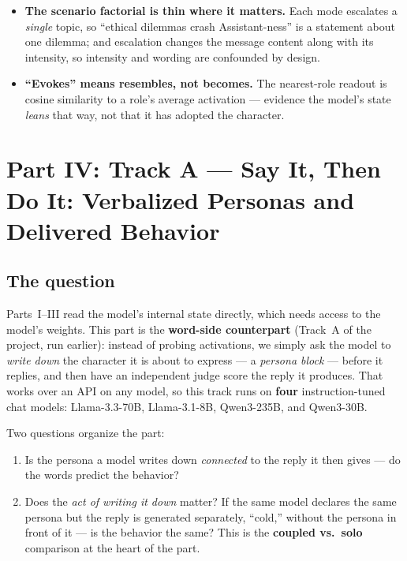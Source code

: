 \documentclass[11pt]{article}
\begin{document}
\begin{itemize}
        correlations are robust, but individual-user numbers (and the
        case-study transcripts) are single draws. The emotional-override
        result rests on 3 samples per cell and should be read as suggestive.
  \item \textbf{The scenario factorial is thin where it matters.} Each mode
        escalates a \emph{single} topic, so ``ethical dilemmas crash
        Assistant-ness'' is a statement about one dilemma; and escalation
        changes the message content along with its intensity, so intensity and
        wording are confounded by design.
  \item \textbf{``Evokes'' means resembles, not becomes.} The nearest-role
        readout is cosine similarity to a role's average activation --- evidence
        the model's state \emph{leans} that way, not that it has adopted the
        character.
\end{itemize}


\clearpage
\section{Part IV: Track A --- Say It, Then Do It: Verbalized Personas and
Delivered Behavior}

\subsection{The question}

Parts~I--III read the model's internal state directly, which needs access to
the model's weights. This part is the \textbf{word-side counterpart} (Track~A
of the project, run earlier): instead of probing activations, we simply ask
the model to \emph{write down} the character it is about to express --- a
\emph{persona block} --- before it replies, and then have an independent judge
score the reply it produces. That works over an API on any model, so this
track runs on \textbf{four} instruction-tuned chat models: Llama-3.3-70B,
Llama-3.1-8B, Qwen3-235B, and Qwen3-30B.

Two questions organize the part:

\begin{enumerate}
  \item Is the persona a model writes down \emph{connected} to the reply it
        then gives --- do the words predict the behavior?
  \item Does the \emph{act of writing it down} matter? If the same model
        declares the same persona but the reply is generated separately,
        ``cold,'' without the persona in front of it --- is the behavior the
        same? This is the \textbf{coupled vs.\ solo} comparison at the heart
        of the part.
\end{enumerate}
\end{document}
